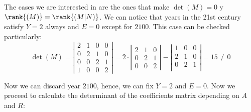 \documentclass[../../main.tex]{subfiles}
\begin{document}
  The cases we are interested in are the ones that make $\det{(M)} = 0$ y $\rank{(M)} = \rank{(M | N)}$. We can notice that years in the 21st century satisfy $Y = 2$ always and $E = 0$ except for $2100$. This case can be checked particularly:
  $$
  \det{(M)} = \left|
    \begin{matrix}
      2 & 1 & 0 & 0 \\
      0 & 2 & 1 & 0 \\
      0 & 0 & 2 & 1 \\
      1 & 0 & 0 & 2
    \end{matrix}
  \right| = 2 \cdot \left |
    \begin{matrix}
      2 & 1 & 0 \\
      0 & 2 & 1 \\
      0 & 0 & 2
    \end{matrix}
  \right| - \left|
    \begin{matrix}
      1 & 0 & 0 \\
      2 & 1 & 0 \\
      0 & 2 & 1 \\
    \end{matrix}
  \right| = 15 \ne 0
  $$

  Now we can discard year $2100$, hence, we can fix $Y = 2$ and $E = 0$. Now we proceed to calculate the determinant of the coefficients matrix depending on $A$ and $R$:
\end{document}
